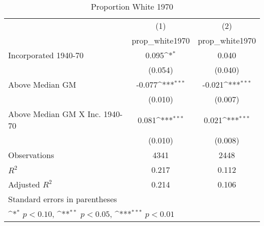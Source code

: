 \begin{table}[htbp]\centering
\def\sym#1{\ifmmode^{#1}\else\(^{#1}\)\fi}
\caption{Proportion White 1970}
\begin{tabular}{l*{2}{c}}
\hline\hline
                    &\multicolumn{1}{c}{(1)}&\multicolumn{1}{c}{(2)}\\
                    &\multicolumn{1}{c}{prop\_white1970}&\multicolumn{1}{c}{prop\_white1970}\\
\hline
Incorporated 1940-70&       0.095\sym{*}  &       0.040         \\
                    &     (0.054)         &     (0.040)         \\
[1em]
Above Median GM     &      -0.077\sym{***}&      -0.021\sym{***}\\
                    &     (0.010)         &     (0.007)         \\
[1em]
Above Median GM X Inc. 1940-70&       0.081\sym{***}&       0.021\sym{***}\\
                    &     (0.010)         &     (0.008)         \\
\hline
Observations        &        4341         &        2448         \\
\(R^{2}\)           &       0.217         &       0.112         \\
Adjusted \(R^{2}\)  &       0.214         &       0.106         \\
\hline\hline
\multicolumn{3}{l}{\footnotesize Standard errors in parentheses}\\
\multicolumn{3}{l}{\footnotesize \sym{*} \(p<0.10\), \sym{**} \(p<0.05\), \sym{***} \(p<0.01\)}\\
\end{tabular}
\end{table}
